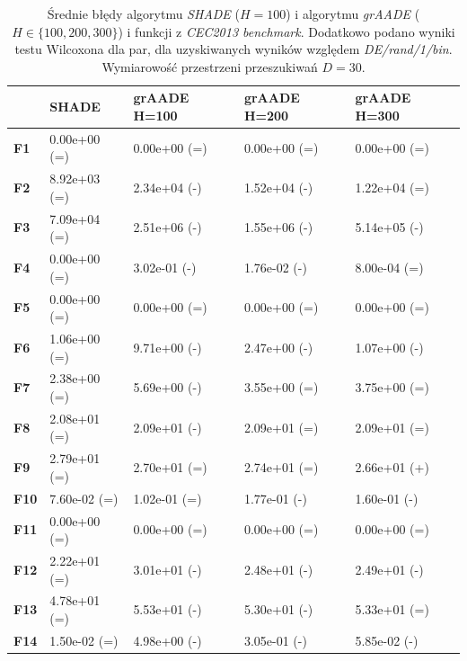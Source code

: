 \documentclass[12pt,a4paper]{report}
\begin{document}
{{{{{{{%



\begin{table}[h]
\centering
\caption{Średnie błędy algorytmu \emph{SHADE} ($H = 100$) i algorytmu \emph{grAADE} ($H \in \{100, 200, 300\}$) i funkcji z \emph{CEC2013 benchmark}. Dodatkowo podano wyniki testu Wilcoxona dla par, dla uzyskiwanych wyników względem \emph{DE/rand/1/bin}. Wymiarowość przestrzeni przeszukiwań $D = 30$.}
\label{Anal12}
\begin{tabular}{|l|l|l|l|l|}
\hline
          & {\bf SHADE}  & {\bf grAADE H=100} & {\bf grAADE H=200} & {\bf grAADE H=300} \\ \hline
{\bf F1}  & 0.00e+00 (=) & 0.00e+00 (=)       & 0.00e+00 (=)       & 0.00e+00 (=)       \\ \hline
{\bf F2}  & 8.92e+03 (=) & 2.34e+04 (-)       & 1.52e+04 (-)       & 1.22e+04 (=)       \\ \hline
{\bf F3}  & 7.09e+04 (=) & 2.51e+06 (-)       & 1.55e+06 (-)       & 5.14e+05 (-)       \\ \hline
{\bf F4}  & 0.00e+00 (=) & 3.02e-01 (-)       & 1.76e-02 (-)       & 8.00e-04 (=)       \\ \hline
{\bf F5}  & 0.00e+00 (=) & 0.00e+00 (=)       & 0.00e+00 (=)       & 0.00e+00 (=)       \\ \hline
{\bf F6}  & 1.06e+00 (=) & 9.71e+00 (-)       & 2.47e+00 (-)       & 1.07e+00 (-)       \\ \hline
{\bf F7}  & 2.38e+00 (=) & 5.69e+00 (-)       & 3.55e+00 (=)       & 3.75e+00 (=)       \\ \hline
{\bf F8}  & 2.08e+01 (=) & 2.09e+01 (-)       & 2.09e+01 (=)       & 2.09e+01 (=)       \\ \hline
{\bf F9}  & 2.79e+01 (=) & 2.70e+01 (=)       & 2.74e+01 (=)       & 2.66e+01 (+)       \\ \hline
{\bf F10} & 7.60e-02 (=) & 1.02e-01 (=)       & 1.77e-01 (-)       & 1.60e-01 (-)       \\ \hline
{\bf F11} & 0.00e+00 (=) & 0.00e+00 (=)       & 0.00e+00 (=)       & 0.00e+00 (=)       \\ \hline
{\bf F12} & 2.22e+01 (=) & 3.01e+01 (-)       & 2.48e+01 (-)       & 2.49e+01 (-)       \\ \hline
{\bf F13} & 4.78e+01 (=) & 5.53e+01 (-)       & 5.30e+01 (-)       & 5.33e+01 (=)       \\ \hline
{\bf F14} & 1.50e-02 (=) & 4.98e+00 (-)       & 3.05e-01 (-)       & 5.85e-02 (-)       \\ \hline

\end{tabular}
\end{table}}}}}}}}
\end{document}
